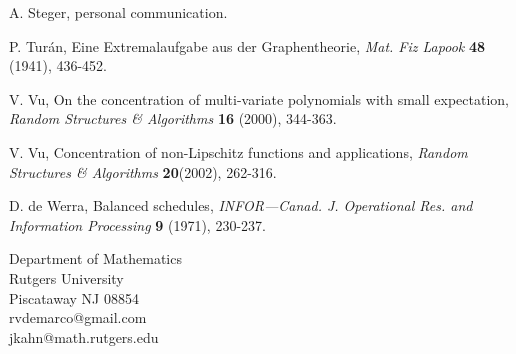 \documentclass[letterpaper,11pt]{article}
\newcommand{\bn}[0]{\bigskip\noindent}
\newcommand{\0}[0]{\emptyset}
\begin{document}
\begin{thebibliography}{99}
 A. Steger, personal communication.


P. Tur\'an, Eine Extremalaufgabe aus der Graphentheorie,
{\em Mat. Fiz Lapook} {\bf 48} (1941), 436-452.

  V. Vu,
On the concentration of multi-variate polynomials with small expectation,
{\em Random Structures \& Algorithms} {\bf 16} (2000), 344-363.

  V. Vu,
Concentration of non-Lipschitz functions and applications,
{\em Random Structures \& Algorithms} {\bf 20}(2002), 262-316.


D. de Werra, Balanced schedules,
{\em INFOR—Canad. J. Operational Res. and Information Processing} {\bf 9} (1971), 230-237.



\end{thebibliography}



\bn
Department of Mathematics\\
Rutgers University\\
Piscataway NJ 08854\\
rvdemarco@gmail.com\\
jkahn@math.rutgers.edu
\end{document}
